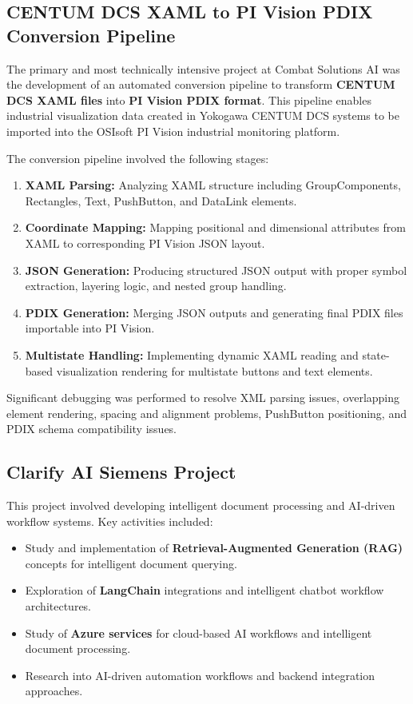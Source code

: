 \documentclass[12pt,a4paper]{report}
\begin{document}
\subsection{CENTUM DCS XAML to PI Vision PDIX Conversion Pipeline}

The primary and most technically intensive project at Combat Solutions AI was the development of an automated conversion pipeline to transform \textbf{CENTUM DCS XAML files} into \textbf{PI Vision PDIX format}. This pipeline enables industrial visualization data created in Yokogawa CENTUM DCS systems to be imported into the OSIsoft PI Vision industrial monitoring platform.

The conversion pipeline involved the following stages:
\begin{enumerate}[leftmargin=1.5cm]
    \item \textbf{XAML Parsing:} Analyzing XAML structure including GroupComponents, Rectangles, Text, PushButton, and DataLink elements.
    \item \textbf{Coordinate Mapping:} Mapping positional and dimensional attributes from XAML to corresponding PI Vision JSON layout.
    \item \textbf{JSON Generation:} Producing structured JSON output with proper symbol extraction, layering logic, and nested group handling.
    \item \textbf{PDIX Generation:} Merging JSON outputs and generating final PDIX files importable into PI Vision.
    \item \textbf{Multistate Handling:} Implementing dynamic XAML reading and state-based visualization rendering for multistate buttons and text elements.
\end{enumerate}

Significant debugging was performed to resolve XML parsing issues, overlapping element rendering, spacing and alignment problems, PushButton positioning, and PDIX schema compatibility issues.

\subsection{Clarify AI Siemens Project}

This project involved developing intelligent document processing and AI-driven workflow systems. Key activities included:
\begin{itemize}[leftmargin=1.5cm]
    \item Study and implementation of \textbf{Retrieval-Augmented Generation (RAG)} concepts for intelligent document querying.
    \item Exploration of \textbf{LangChain} integrations and intelligent chatbot workflow architectures.
    \item Study of \textbf{Azure services} for cloud-based AI workflows and intelligent document processing.
    \item Research into AI-driven automation workflows and backend integration approaches.
\end{itemize}
\end{document}
